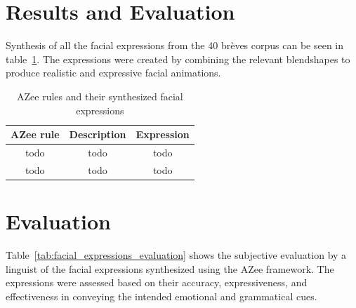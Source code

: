\documentclass[../../main]{subfiles}
\begin{document}

\section{Results and Evaluation}
\label{ch:facial_expressions:results}

Synthesis of all the facial expressions from the 40 brèves corpus can be seen in table~\ref{tab:facial_expressions}. The expressions were created by combining the relevant blendshapes to produce realistic and expressive facial animations.

\begin{table}
    \centering
    \begin{tabular}{|c|c|c|}
        \hline
        \textbf{AZee rule} & \textbf{Description} & \textbf{Expression} \\
        \hline
        todo & todo & todo \\
        todo & todo & todo \\
        \hline
    \end{tabular}
    \caption{AZee rules and their synthesized facial expressions}
    \label{tab:facial_expressions}
\end{table}

\section{Evaluation}
\label{ch:facial_expressions:evaluation}

Table~\ref{tab:facial_expressions_evaluation} shows the subjective evaluation by a linguist of the facial expressions synthesized using the AZee framework. The expressions were assessed based on their accuracy, expressiveness, and effectiveness in conveying the intended emotional and grammatical cues.
\end{document}
